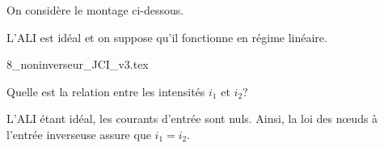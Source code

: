 


\finEntrainement









\hauteurLargeurCadreReponse		{8mm}{3.5cm}
\initialisationEntrainement

On considère le montage ci-dessous. 

L’ALI est idéal et on suppose qu’il fonctionne en régime linéaire.
\smallskip

\begin{center}
  \shorthandoff{!:}
  {8_noninverseur_JCI_v3.tex}
  \shorthandon{!:}
\end{center}

\minusMedskip

\debutEntrainement



\begin{enonce}
  Quelle est la relation entre les intensités \(i_{1}\) et \(i_{2}\)?
\end{enonce}


\begin{corrige}
  L’ALI étant idéal, les courants d’entrée sont nuls. Ainsi, la loi des nœuds à l’entrée inverseuse assure que \(i_{1} = i_{2}\).
\end{corrige}

